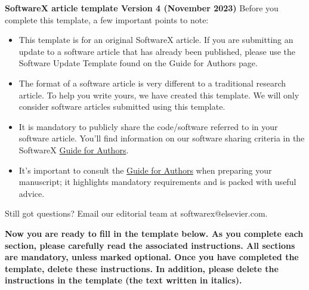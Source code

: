 \documentclass[preprint,12pt, a4paper]{elsarticle}
\begin{document}
\renewcommand{\labelenumii}{\arabic{enumi}.\arabic{enumii}}

\begin{frontmatter}

  {\large\textbf{SoftwareX article template Version 4 (November 2023)}}
  Before you complete this template, a few important points to note:
  \begin{itemize}
\item	This template is for an original SoftwareX article. If you are submitting an update to a software article that has already been published, please use the Software Update Template found on the Guide for Authors page.
\item	The format of a software article is very different to a traditional research article. To help you write yours, we have created this template. We will only consider software articles submitted using this template.
\item	It is mandatory to publicly share the code/software referred to in your software article. You’ll find information on our software sharing criteria in the SoftwareX \href{https://www.elsevier.com/journals/softwarex/2352-7110/guide-for-authors}{Guide for Authors}.  
\item	It’s important to consult the \href{https://www.elsevier.com/journals/softwarex/2352-7110/guide-for-authors}{Guide for Authors} when preparing your manuscript; it highlights mandatory requirements and is packed with useful advice.
\end{itemize}
%
Still got questions?
Email our editorial team at softwarex@elsevier.com.

\textbf{Now you are ready to fill in the template below. As you complete each section, please carefully read the associated instructions. All sections are mandatory, unless marked optional.
Once you have completed the template, delete these instructions. In addition, please delete the instructions in the template (the text written in italics).}
 



\end{frontmatter}
\end{document}
